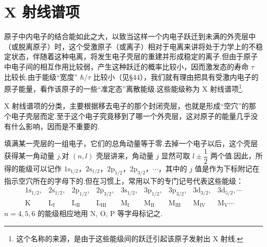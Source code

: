 \section{X 射线谱项}

原子中内电子的结合能如此之大，以致当这样一个内电子跃迁到未满的外壳层中（或脱离原子）时，这个受激原子（或离子）相对于电离来讲将处于力学上的不稳定状态，伴随着这种电离，将发生电子壳层的重建并形成稳定的离子.但由于原子中电子间的相互作用比较弱，产生这种跃迁的概率比较小，因而激发态的寿命 $\tau$ 比较长.由于能级“宽度” $\hbar/\tau$ 比较小（见§44），我们就有理由把具有受激内电子的原子能量，看作该原子的一些“准定态”离散能级.这些能级称为 X 射线谱项\footnote{这个名称的来源，是由于这些能级间的跃迁引起该原子发射出 X 射线.}.

X 射线谱项的分类，主要根据移去电子的那个封闭壳层，也就是形成“空穴”的那个电子壳层而定.至于这个电子究竟移到了哪一个外壳层，这对原子的能量几乎没有什么影响，因而是不重要的.

填满某一壳层的一组电子，它们的总角动量等于零.去掉一个电子以后，这个壳层获得某一角动量 $j$.对 $(n,l)$ 壳层讲来，角动量 $j$ 显然可取 $l\pm\dfrac{1}{2}$ 两个值.因此，所得的能级可以记作 $1\mathrm{s}_{1/2}$，$2\mathrm{s}_{1/2}$，$2\mathrm{p}_{1/2}$，$2\mathrm{p}_{3/2}$，$\cdots$，其中的 $j$ 值是作为下标附记在指示空穴所在的字母下的.但在习惯上，常用以下的专门记号代表这些能级：
\begin{equation*}
\begin{array}{ccccccccc}
1\mathrm{s}_{1/2}, & 2\mathrm{s}_{1/2}, & 2\mathrm{p}_{1/2}, & 2\mathrm{p}_{3/2}, &
3\mathrm{s}_{1/2}, & 3\mathrm{p}_{1/2}, & 3\mathrm{p}_{3/2}, &
3\mathrm{d}_{3/2}, & 3\mathrm{d}_{5/2},\cdots\\
\mathrm{K} & \mathrm{L}_{\mathrm{I}} & \mathrm{L}_{\mathrm{II}} & \mathrm{L}_{\mathrm{III}} &
\mathrm{M}_{\mathrm{I}} & \mathrm{M}_{\mathrm{II}} & \mathrm{M}_{\mathrm{III}} &
\mathrm{M}_{\mathrm{IV}} & \mathrm{M}_{\mathrm{V}}\cdots
\end{array}
\end{equation*}
$n=4,5,6$ 的能级相应地用 N, O, P 等字母标记之.

